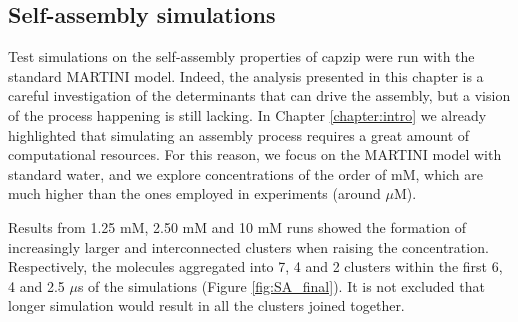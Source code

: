 \subsection{Self-assembly simulations}
Test simulations on the self-assembly properties of capzip were run with the standard MARTINI model. Indeed, the analysis presented in this chapter is a careful investigation of the determinants that can drive the assembly, but a vision of the process happening is still lacking.
%
In Chapter \ref{chapter:intro} we already highlighted that simulating an assembly process requires a great amount of computational resources. For this reason, we focus on the MARTINI model with standard water, and we explore concentrations of the order of mM, which are much higher than the ones employed in experiments (around $\mu$M).

Results from 1.25 mM, 2.50 mM and 10 mM runs showed the formation of increasingly larger and interconnected clusters when raising the concentration. Respectively, the molecules aggregated into 7, 4 and 2 clusters within the first 6, 4 and 2.5 $\mu$s of the simulations (Figure \ref{fig:SA_final}). It is not excluded that longer simulation would result in all the clusters joined together.
%
